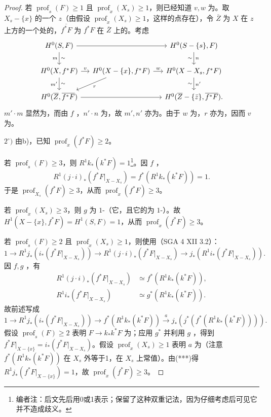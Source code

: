 \begin{proof}
若 $\operatorname{prof}_s(F)\geq1$ 且 $\operatorname{prof}_x(X_s)\geq1$，则已经知道 $v,w$ 为。取 $X_s-\{x\}$ 的一个 $z$（由假设 $\operatorname{prof}_x(X_s)\geq1$，这样的点存在），令 $\overline Z$ 为 $X$ 在 $z$ 上方的一个处的，$\overline{f^*F}$ 为 $f^*F$ 在 $\overline Z$ 上的。考虑
\[\begin{tikzcd}[column sep=small]
H^0(S,F)\arrow[rr]\arrow[d,"m"',"\sim"]&&H^0(S-\{s\},F)\arrow[d,"n","\sim"']\\
H^0(X,f^*F)\arrow[r,"v"]\arrow[d,"m'"',"\sim"]&H^0(X-\{x\},f^*F)\arrow[r,"w"]\arrow[dl,"r"]&H^0(X-X_s,f^*F)\arrow[d,"n'","\sim"']\\
H^0(\overline Z,\overline{f^*F})\arrow[rr]&&H^0(\overline Z-\{\bar z\},\overline{f^*F}).
\end{tikzcd}\]
 $m'\cdot m$ 显然为，而由 $f$ ，$n'\cdot n$ 为，故 $m',n'$ 亦为。由于 $w$ 为，$r$ 亦为，因而 $v$ 为。

$2^\circ)$ 由b)，已知 $\operatorname{prof}_x(f^*F)\geq2$。

若 $\operatorname{prof}_s(F)\geq3$，则 $R^1k_*(k^*F)=1$\footnote{编者注：后文先后用0或1表示；保留了这种双重记法，因为仔细考虑后可见它并不造成歧义。}。因 $f$ ，
\[R^1(j\cdot i)_*(f^*F|_{X-X_s})=f^*(R^1k_*(k^*F))=1.\]
于是 $\operatorname{prof}_{X_s}(f^*F)\geq3$，从而 $\operatorname{prof}_x(f^*F)\geq3$。

若 $\operatorname{prof}_x(X_s)\geq3$，则 $g$ 为 $1$-（它，且它的为 $1$-）。故 $H^1(X-\{x\},f^*F)=H^1(S,F)=1$，从而 $\operatorname{prof}_x(f^*F)\geq3$。

若 $\operatorname{prof}_s(F)\geq2$ 且 $\operatorname{prof}_x(X_s)\geq1$，则使用（SGA 4 XII 3.2）：
\[1\longrightarrow R^1j_*(i_*(f^*F|_{X-X_s}))\longrightarrow R^1(j\cdot i)_*(f^*F|_{X-X_s})\longrightarrow j_*(R^1i_*(f^*F|_{X-X_s})).\]
因 $f,g$ ，有
\[\begin{aligned}
R^1(j\cdot i)_*(f^*F|_{X-X_s})&\simeq f^*(R^1k_*(k^*F)),\\
R^1i_*(f^*F|_{X-X_s})&\simeq g^*(R^1k_*(k^*F)).
\end{aligned}\]
故前述写成
\[1\longrightarrow R^1j_*(i_*(f^*F|_{X-X_s}))\longrightarrow f^*(R^1k_*(k^*F))\xrightarrow a j_*(j^*(f^*(R^1k_*(k^*F)))).\tag{***}\]
假设 $\operatorname{prof}_s(F)\geq2$ 表明 $F\to k_*k^*F$ 为；应用 $g^*$ 并利用 $g$ ，得到 $f^*F|_{X-\{x\}}=i_*(f^*F|_{X-X_s})$。假设 $\operatorname{prof}_x(X_s)\geq1$ 表明 $a$ 为（注意 $f^*(R^1k_*(k^*F))$ 在 $X_s$ 外等于1，在 $X_s$ 上常值）。由(***)得 $R^1j_*(f^*F|_{X-\{x\}})=1$，故 $\operatorname{prof}_x(f^*F)\geq3$。


\end{proof}
